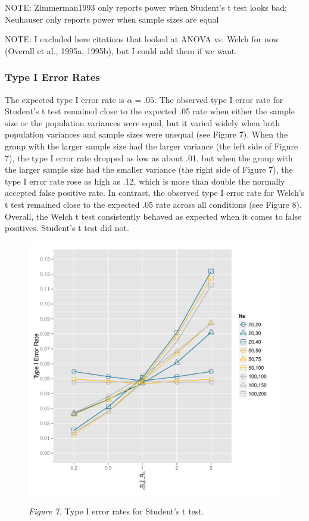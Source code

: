 \documentclass[man,a4paper,noextraspace,apacite]{apa6}\usepackage[]{graphicx}\usepackage[]{color}
\makeatletter
\def\maxwidth{ %
  \ifdim\Gin@nat@width>\linewidth
    \linewidth
  \else
    \Gin@nat@width
  \fi
}
\newenvironment{knitrout}{}{} %
\makeatother
\begin{document}
NOTE: Zimmerman1993 only reports power when Student's t test looks bad; Neuhauser only reports power when sample sizes are equal

NOTE: I excluded here citations that looked at ANOVA vs. Welch for now (Overall et al., 1995a, 1995b), but I could add them if we want.
    
\subsubsection{Type I Error Rates}


    The expected type I error rate is $\alpha = .05$. The observed type I error rate for Student's t test remained close to the expected .05 rate when either the sample size or the population variances were equal, but it varied widely when both population variances and sample sizes were unequal (see Figure 7). When the group with the larger sample size had the larger variance (the left side of Figure 7), the type I error rate dropped as low as about .01, but when the group with the larger sample size had the smaller variance (the right side of Figure 7), the type I error rate rose as high as .12, which is more than double the normally accepted false positive rate. In contrast, the observed type I error rate for Welch's t test remained close to the expected .05 rate across all conditions (see Figure 8). Overall, the Welch t test consistently behaved as expected when it comes to false positives. Student's t test did not.

\begin{figure}    
\begin{knitrout}
\color{fgcolor}
\includegraphics[width=\maxwidth]{figure/type1_classic_plot} 

\end{knitrout}
\textit{Figure 7.} Type I error rates for Student's t test.
\end{figure}
\end{document}
